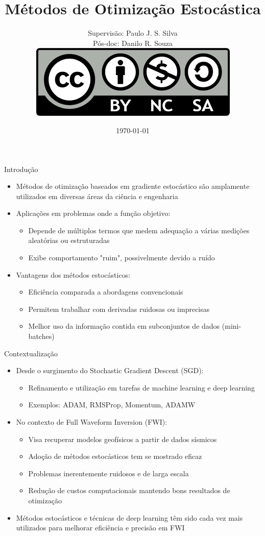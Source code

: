 \documentclass[aspectratio=1610]{beamer}
\title[Métodos de Otimização Estocástica]{\huge Métodos de Otimização Estocástica}
\author[Equipe de Otimização]{%
  \texorpdfstring{%
    Supervisão: Paulo J. S. Silva \\ 
    Pós-doc: Danilo R. Souza\vspace{1em}\\
    \href{https://creativecommons.org/licenses/by-nc-sa/4.0/}
    {\includegraphics[width=0.38\columnwidth]{figures/LicenceCC_BY-NC-SA4.png}}
  }{Supervisão: Paulo J. S. Silva, Pós-doc: Danilo R. Souza}%
}
\date{\today}
\begin{document}
\maketitle

\begin{frame}{Introdução}
\begin{itemize}
    \item Métodos de otimização baseados em gradiente estocástico são amplamente utilizados em diversas áreas da ciência e engenharia
    \item Aplicações em problemas onde a função objetivo:
    \begin{itemize}
        \item Depende de múltiplos termos que medem adequação a várias medições aleatórias ou estruturadas
        \item Exibe comportamento "ruim", possivelmente devido a ruído
    \end{itemize}
    \item Vantagens dos métodos estocásticos:
    \begin{itemize}
        \item Eficiência comparada a abordagens convencionais
        \item Permitem trabalhar com derivadas ruidosas ou imprecisas
        \item Melhor uso da informação contida em subconjuntos de dados (mini-batches)
    \end{itemize}
\end{itemize}
\end{frame}

\begin{frame}{Contextualização}
\begin{itemize}
    \item Desde o surgimento do Stochastic Gradient Descent (SGD):
    \begin{itemize}
        \item Refinamento e utilização em tarefas de machine learning e deep learning
        \item Exemplos: ADAM, RMSProp, Momentum, ADAMW
    \end{itemize}
    \item No contexto de Full Waveform Inversion (FWI):
    \begin{itemize}
        \item Visa recuperar modelos geofísicos a partir de dados sísmicos
        \item Adoção de métodos estocásticos tem se mostrado eficaz
        \item Problemas inerentemente ruidosos e de larga escala
        \item Redução de custos computacionais mantendo bons resultados de otimização
    \end{itemize}
    \item Métodos estocásticos e técnicas de deep learning têm sido cada vez mais utilizados para melhorar eficiência e precisão em FWI
\end{itemize}
\end{frame}
\end{document}
